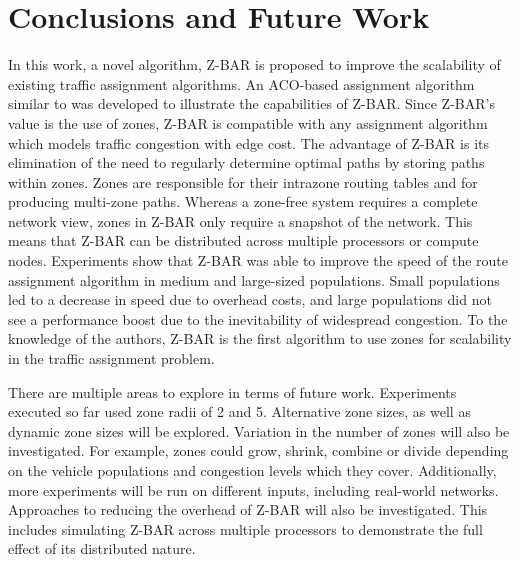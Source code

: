 \documentclass[conference]{IEEEtran}
\begin{document}
\section{Conclusions and Future Work} %

In this work, a novel algorithm, Z-BAR is proposed to improve the scalability of existing traffic assignment algorithms. An ACO-based assignment algorithm similar to \cite{iaco} was developed to illustrate the capabilities of Z-BAR. Since Z-BAR's value is the use of zones, Z-BAR is compatible with any assignment algorithm which models traffic congestion with edge cost. The advantage of Z-BAR is its elimination of the need to regularly determine optimal paths by storing paths within zones. Zones are responsible for their intrazone routing tables and for producing multi-zone paths. Whereas a zone-free system requires a complete network view, zones in Z-BAR only require a snapshot of the network. This means that Z-BAR can be distributed across multiple processors or compute nodes. Experiments show that Z-BAR was able to improve the speed of the route assignment algorithm in medium and large-sized populations. Small populations led to a decrease in speed due to overhead costs, and large populations did not see a performance boost due to the inevitability of widespread congestion. To the knowledge of the authors, Z-BAR is the first algorithm to use zones for scalability in the traffic assignment problem.

There are multiple areas to explore in terms of future work. Experiments executed so far used zone radii of 2 and 5. Alternative zone sizes, as well as dynamic zone sizes will be explored. Variation in the number of zones will also be investigated. For example, zones could grow, shrink, combine or divide depending on the vehicle populations and congestion levels which they cover. Additionally, more experiments will be run on different inputs, including real-world networks. Approaches to reducing the overhead of Z-BAR will also be investigated. This includes simulating Z-BAR across multiple processors to demonstrate the full effect of its distributed nature.
\end{document}
